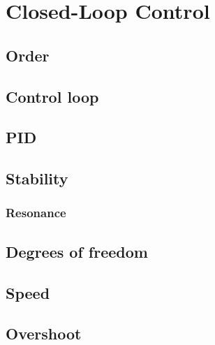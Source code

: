 \chapter{Closed-Loop Control}


\section{Order}

\section{Control loop}

\section{PID}

\section{Stability}
\subsection{Resonance}

\section{Degrees of freedom}

\section{Speed}

\section{Overshoot}